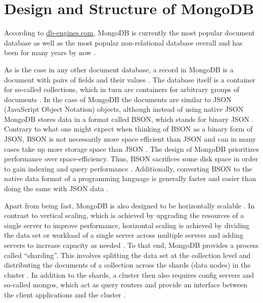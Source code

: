 
\section{Design and Structure of MongoDB}
According to \url{db-engines.com}, MongoDB is currently the most popular document database as well as the most popular non-relational database overall
and has been for many years by now \parencite{DB-Engines-Ranking, DB-Engines-Trend}. 

As is the case in any other document database, a record in MongoDB is a document with pairs of fields and their values \parencite[p. 90]{chauhan2019review}. 
The database itself is a container for so-called collections, which in turn are containers for arbitrary groups of documents \parencite[p. 90]{chauhan2019review}.
In the case of MongoDB the documents are similar to JSON (JavaScript Object Notation) objects, although instead of using native JSON MongoDB stores data 
in a format called BSON, which stands for binary JSON \parencites[p. 4]{Membrey2014}[p. 90]{chauhan2019review}. Contrary to what one might expect when 
thinking of BSON as a binary form of JSON, BSON is not necessarily more space efficient than JSON and can in many cases take up more storage space than JSON \parencite[p. 11]{Membrey2014}. 
The design of MongoDB prioritizes performance over space-efficiency. Thus, BSON sacrifices some disk space in order to gain indexing and query performance \parencite[p. 11]{Membrey2014}.
Additionally, converting BSON to the native data format of a programming language is generally faster and easier than doing the same with JSON data \parencite[p. 11]{Membrey2014}. 

Apart from being fast, MongoDB is also designed to be horizontally scalable \parencite[p. 2, 6-7]{Membrey2014}. In contrast to vertical scaling, which is achieved by upgrading the resources
of a single server to improve performance, horizontal scaling is achieved by dividing the data set or workload of a single server across multiple servers and adding
servers to increase capacity as needed \parencite{Mongo-Sharding}. To that end, MongoDB provides a process called \enquote{sharding}. This involves splitting the 
data set at the collection level and distributing the documents of a collection across the shards (data nodes) in the cluster \parencites{Mongo-Sharding}[p. 7]{Membrey2014}.
In addition to the shards, a cluster then also requires config servers and so-called mongos, which act as query routers and provide an interface between the 
client applications and the cluster \parencite{Mongo-Sharding}.

